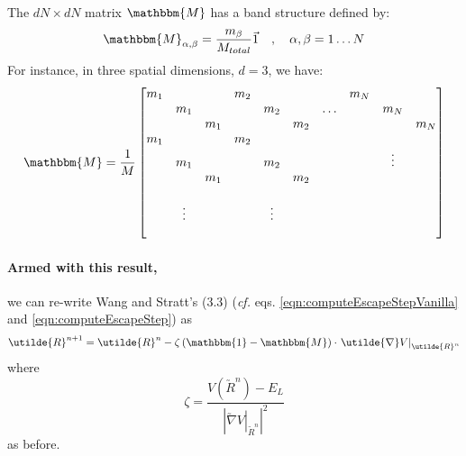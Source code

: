 \documentclass[letterpaper,12pt]{article}
\newcommand{\cvec}[1]{\utilde{#1}}
\newcommand{\svec}[1]{\vec{#1}}
\newcommand{\laeq}[1]{\label{eqn:#1}}
\begin{document}
The $dN \times dN$ matrix $\mathbbm{M}$ has a band structure defined by:
\begin{equation}
\mathbbm{M}_{\alpha, \beta} = \frac{m_{\beta}}{M_{total}} \svec{1} \quad , \quad \alpha,\beta = 1 \ldots N
\end{equation}
For instance, in three spatial dimensions, $d=3$, we have:
\begin{equation}
\mathbbm{M} = \frac{1}{M}
\begin{bmatrix}
m_1 &        &     & m_2 &        &     &        & m_N  &        &     \\
    & m_1    &     &     & m_2    &     & \ldots &      &  m_N   &     \\
    &        & m_1 &     &        & m_2 &        &      &        & m_N \\ 
m_1 &        &     & m_2 &        &     &        &      &        &     \\
    & m_1    &     &     & m_2    &     &        &      & \vdots &     \\
    &        & m_1 &     &        & m_2 &        &      &        &     \\ 
    &        &     &     &        &     &        &      &        &     \\
    & \vdots &     &     & \vdots &     &        &      &        &     \\
    &        &     &     &        &     &        &      &        &     \\ 
\end{bmatrix}
\end{equation}

\paragraph{Armed with this result,} \hspace{-1em} we can re-write Wang and Stratt's (3.3) (\emph{cf.} eqs. \ref{eqn:computeEscapeStepVanilla} and \ref{eqn:computeEscapeStep}) as
\begin{equation} \laeq{corrected33}
\cvec{R}^{n+1} = \cvec{R}^{n} - \zeta \left( \mathbbm{1} - \mathbbm{M} \right) \cdot \left. \cvec{\nabla}V\right|_{\cvec{R}^{n}}
\end{equation}
where
\begin{equation}
\zeta = \frac{V(\cvec{R}^{n})-E_L}{\left| \left. \cvec{\nabla}V\right|_{\cvec{R}^{n}} \right|^2}
\end{equation}
as before.
\end{document}
